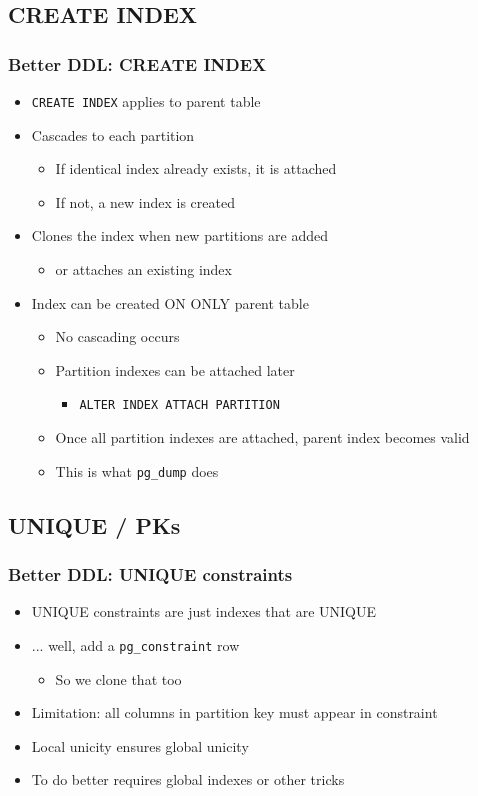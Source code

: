 \subsection{CREATE INDEX}
\begin{frame}
  \frametitle{Better DDL: CREATE INDEX}

  \begin{itemize}
    \item \texttt{CREATE INDEX} applies to parent table
    \item Cascades to each partition
      \begin{itemize}
	\item If identical index already exists, it is attached
	\item If not, a new index is created
      \end{itemize}
    \item Clones the index when new partitions are added
      \begin{itemize}
	\item or attaches an existing index
      \end{itemize}
      \pause
    \item Index can be created ON ONLY parent table
      \begin{itemize}
	\item No cascading occurs
	\item Partition indexes can be attached later
	  \begin{itemize}
	    \item \texttt{ALTER INDEX ATTACH PARTITION}
	  \end{itemize}
        \item Once all partition indexes are attached, parent index becomes valid
	  \pause
	\item This is what \texttt{pg\_dump} does 
      \end{itemize}
  \end{itemize}
\end{frame}

\subsection{UNIQUE / PKs}
\begin{frame}
  \frametitle{Better DDL: UNIQUE constraints}

  \begin{itemize}
    \item UNIQUE constraints are just indexes that are UNIQUE
    \item ... well, add a \texttt{pg\_constraint} row
      \begin{itemize}
	\item So we clone that too
      \end{itemize}
    \item<2-> Limitation: all columns in partition key must appear in constraint
    \item<2-> Local unicity ensures global unicity
    \item<2-> To do better requires global indexes or other tricks
  \end{itemize}
\end{frame}

